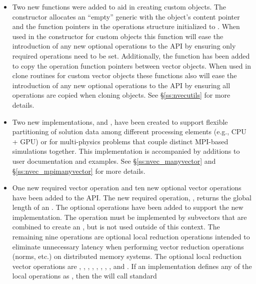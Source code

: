 \begin{itemize}
\item Two new functions were added to aid in creating custom {\nvector} objects. The
constructor  allocates an ``empty'' generic {\nvector} with the
object's content pointer and the function pointers in the operations structure
initialized to . When used in the constructor for custom objects this
function will ease the introduction of any new optional operations to the
{\nvector} API by ensuring only required operations need to be set.
Additionally, the function  has been added to copy the
operation function pointers between vector objects. When used in clone routines
for custom vector objects these functions also will ease the introduction of
any new optional operations to the {\nvector} API by ensuring all operations
are copied when cloning objects. See \S\ref{ss:nvecutils} for more details.
%
\item Two new {\nvector} implementations, {\nvecmanyvector} and
{\nvecmpimanyvector}, have been created to support flexible partitioning
of solution data among different processing elements (e.g., CPU + GPU) or for
multi-physics problems that couple distinct MPI-based simulations together. This
implementation is accompanied by additions to user documentation and {\sundials}
examples. See \S\ref{ss:nvec_manyvector} and \S\ref{ss:nvec_mpimanyvector} for
more details.
%
\item One new required vector operation and ten new optional vector operations have
been added to the {\nvector} API. The new required operation, ,
returns the global length of an . The optional operations have
been added to support the new \newline\noindent
{\nvecmpimanyvector} implementation. The
operation  must be implemented by subvectors that are
combined to create an {\nvecmpimanyvector}, but is not used outside of
this context. The remaining nine operations are optional local reduction
operations intended to eliminate unnecessary latency when performing vector
reduction operations (norms, etc.) on distributed memory systems. The optional
local reduction vector operations are
,
,
,
,
,
,
,
, and
.
If an {\nvector} implementation defines any of the local operations as
, then the {\nvecmpimanyvector} will call standard {\nvector}

\end{itemize}
